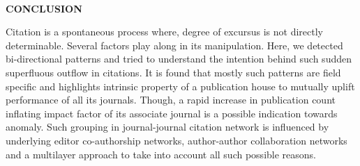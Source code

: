 \\
\begin{center}
    \large \textbf{CONCLUSION}
\end{center}
Citation is a spontaneous process where, degree of excursus is not directly determinable. Several factors play along in its manipulation. Here, we detected bi-directional patterns and tried to understand the intention behind such sudden superfluous outflow in citations. It is found that mostly such patterns are field specific and highlights intrinsic property of a publication house to mutually uplift performance of all its journals. Though, a rapid increase in publication count inflating impact factor of its associate journal is a possible indication towards anomaly. Such grouping in journal-journal citation network is influenced by underlying editor co-authorship networks, author-author collaboration networks and a multilayer approach to take into account all such possible reasons.

